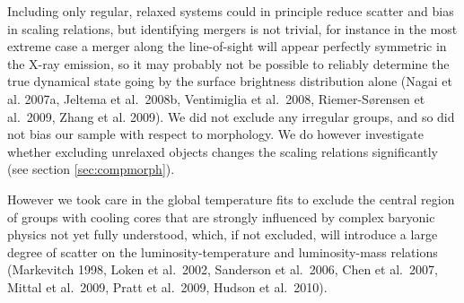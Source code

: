 \documentclass[structabstract]{aa}
\begin{document}
Including only regular, relaxed systems could in principle reduce scatter and
bias in scaling relations, but identifying mergers is not trivial, for
instance in the most extreme case a merger along the line-of-sight will appear
perfectly symmetric in the X-ray emission, so it may probably not be possible
to reliably determine the true dynamical state going by the surface brightness
distribution alone (Nagai et al. 2007a, Jeltema et al.\ 2008b, Ventimiglia et
al.\ 2008, Riemer-S\o rensen et al.\ 2009, Zhang et al. 2009). We did not
exclude any irregular groups, and so did not bias our sample with respect to
morphology. We do however investigate whether excluding unrelaxed objects
changes the scaling relations significantly (see section \ref{sec:compmorph}).

However we took care in the global temperature fits to exclude the central
region of groups with cooling cores that are strongly influenced by
complex baryonic physics not yet fully understood, which, if not
excluded, will introduce a large degree of scatter on the
luminosity-temperature and luminosity-mass relations (Markevitch 1998,
Loken et al.\ 2002, Sanderson et al.\ 2006, Chen et al.\ 2007, Mittal
et al.\ 2009, Pratt et al.\ 2009, Hudson et al.\ 2010).
\end{document}

